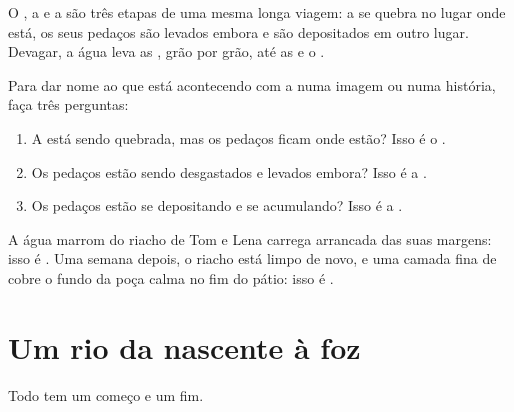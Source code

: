 O , a  e a  são três etapas de uma mesma longa
viagem: a  se quebra no lugar onde está, os seus pedaços são levados
embora e são depositados em outro lugar. Devagar, a água leva as
, grão por grão, até as  e o .

\begin{method}\label{met:g5:water-shapes-the-land:naming}
Para dar nome ao que está acontecendo com a  numa imagem ou numa
história, faça três perguntas:
\begin{enumerate}
  \item A  está sendo quebrada, mas os pedaços ficam onde estão? Isso
        é o \emph{}.
  \item Os pedaços estão sendo desgastados e levados embora? Isso é a
        \emph{}.
  \item Os pedaços estão se depositando e se acumulando? Isso é a
        \emph{}.
\end{enumerate}
\end{method}

\begin{example}\label{ex:g5:water-shapes-the-land:stream}
A água marrom do riacho de Tom e Lena carrega  arrancada das suas
margens: isso é . Uma semana depois, o riacho está limpo de novo, e
uma camada fina de  cobre o fundo da poça calma no fim do pátio: isso
é .
\end{example}

\section{Um rio da nascente à foz}

Todo  tem um começo e um fim.

